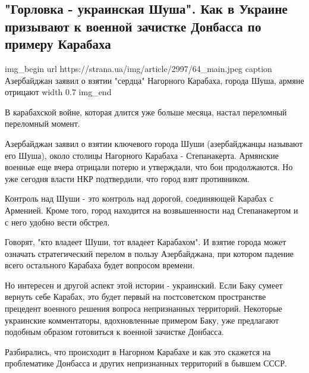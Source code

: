  
 
 

\subsection{"Горловка - украинская Шуша". Как в Украине призывают к военной зачистке Донбасса по примеру Карабаха}


\ifcmt
img_begin 
	url https://strana.ua/img/article/2997/64_main.jpeg
	caption Азербайджан заявил о взятии "сердца" Нагорного Карабаха, города Шуша, армяне отрицают 
	width 0.7
img_end
\fi

В карабахской войне, которая длится уже больше месяца, настал переломный
переломный момент.

Азербайджан заявил о взятии ключевого города Шуши (азербайджанцы называют его
Шуша), около столицы Нагорного Карабаха - Степанакерта. Армянские военные еще
вчера отрицали потерю и утверждали, что бои продолжаются. Но уже сегодня власти
НКР подтвердили, что город взят противником. 

Контроль над Шуши - это контроль над дорогой, соединяющей Карабах с Арменией.
Кроме того, город находится на возвышенности над Степанакертом и с него удобно
вести обстрел.

Говорят, "кто владеет Шуши, тот владеет Карабахом". И взятие города может
означать стратегический перелом в пользу Азербайджана, при котором падение
всего остального Карабаха будет вопросом времени.

Но интересен и другой аспект этой истории - украинский. Если Баку сумеет
вернуть себе Карабах, это будет первый на постсоветском пространстве прецедент
военного решения вопроса непризнанных территорий. Некоторые украинские
комментаторы, вдохновленные примером Баку, уже предлагают подобным образом
готовиться к военной зачистке Донбасса. 

Разбирались, что происходит в Нагорном Карабахе и как это скажется на
проблематике Донбасса и других непризнанных территорий в бывшем СССР. 

